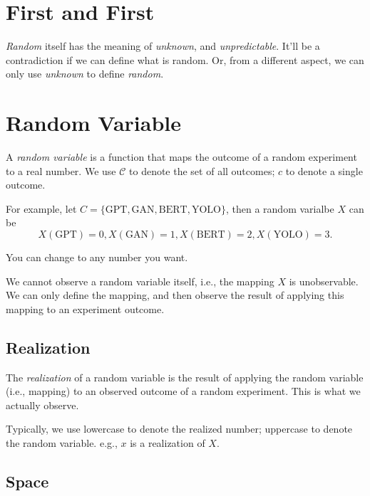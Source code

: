 \documentclass{article}
\begin{document}
    \section*{First and First}

        \textit{Random} itself has the meaning of \textit{unknown}, and
        \textit{unpredictable}. It'll be a contradiction if we can define what
        is random. Or, from a different aspect, we can only use
        \textit{unknown} to define \textit{random}.

    \section{Random Variable}

        A \textit{random variable} is a function that maps the outcome of a
        random experiment to a real number. We use $ \mathcal{C} $ to
        denote the set of all outcomes; $ c $ to denote a single outcome.

        For example, let $ C =  \{ \text{GPT}, \text{GAN}, \text{BERT},
        \text{YOLO} \} $, then a random varialbe $ X $ can be
        \begin{equation*}
             X(\text{GPT}) = 0, X(\text{GAN}) = 1, X(\text{BERT}) = 2,
             X(\text{YOLO}) = 3.
        \end{equation*}

        You can change to any number you want.

        We cannot observe a random variable itself, i.e., the mapping $ X $
        is unobservable. We can only define the mapping, and then observe
        the result of applying this mapping to an experiment outcome.

        \subsection{Realization}

            The \textit{realization} of a random variable is the result of
            applying the random variable (i.e., mapping) to an observed outcome
            of a random experiment. This is what we actually observe.

            Typically, we use lowercase to denote the realized number;
            uppercase to denote the random variable. e.g., $ x $ is a
            realization of $ X $.

        \subsection{Space}
\end{document}
